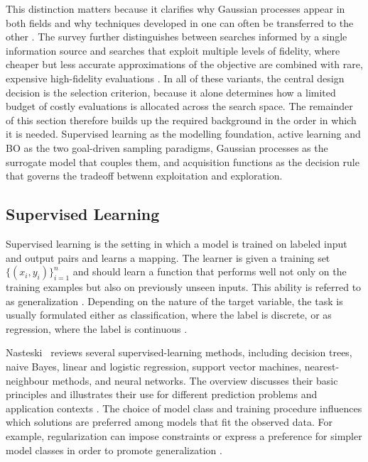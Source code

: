 This distinction matters because it clarifies why Gaussian processes appear in both fields and why techniques developed in one can often be transferred to the other \cite{di2024active}. The survey further distinguishes between searches informed by a single information source and searches that exploit multiple levels of fidelity, where cheaper but less accurate approximations of the objective are combined with rare, expensive high-fidelity evaluations \cite{di2024active}. In all of these variants, the central design decision is the selection criterion, because it alone determines how a limited budget of costly evaluations is allocated across the search space. The remainder of this section therefore builds up the required background in the order in which it is needed. Supervised learning as the modelling foundation, active learning and BO as the two goal-driven sampling paradigms, Gaussian processes as the surrogate model that couples them, and acquisition functions as the decision rule that governs the tradeoff betwenn exploitation and exploration.

\subsection{Supervised Learning}
Supervised learning is the setting in which a model is trained on labeled input and output pairs and learns a mapping. The learner is given a training set $\{(x_i,y_i)\}_{i=1}^{n}$ and should learn a function that performs well not only on the training examples but also on previously unseen inputs. This ability is referred to as generalization \cite{Goodfellow-et-al-2016}. Depending on the nature of the target variable, the task is usually formulated either as classification, where the label is discrete, or as regression, where the label is continuous \cite{nasteski2017overview}.

Nasteski~\cite{nasteski2017overview} reviews several supervised-learning methods, including decision trees, naive Bayes, linear and logistic regression, support vector machines, nearest-neighbour methods, and neural networks. The overview discusses their basic principles and illustrates their use for different prediction problems and application contexts \cite{nasteski2017overview}. The choice of model class and training procedure influences which solutions are preferred among models that fit the observed data. For example, regularization can impose constraints or express a preference for simpler model classes in order to promote generalization \cite{Goodfellow-et-al-2016}.

